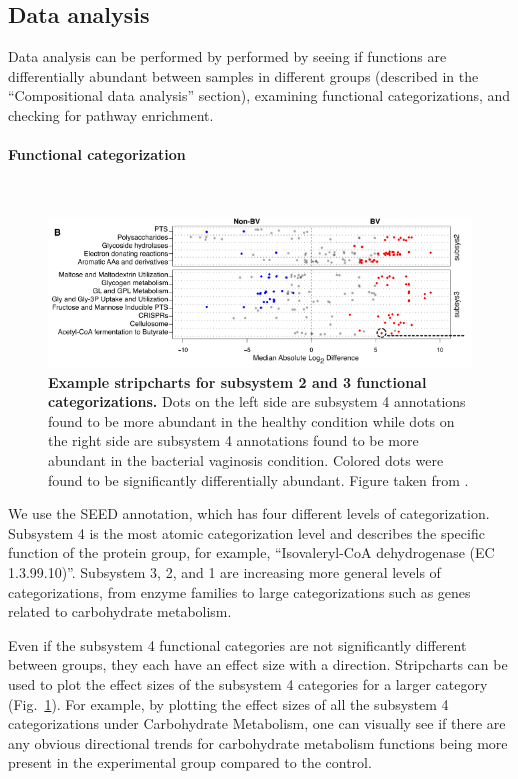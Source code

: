 \subsection{Data analysis}
Data analysis can be performed by performed by seeing if functions are differentially abundant between samples in different groups (described in the “Compositional data analysis” section), examining functional categorizations, and checking for pathway enrichment.

\paragraph{Functional categorization}\mbox{}\\

\begin{figure}[h]
\begin{center}
\includegraphics[width=\textwidth]{stripchart.png}
\caption[Example stripcharts for subsystem 2 and 3 functional categorizations.]{\textbf{Example stripcharts for subsystem 2 and 3 functional categorizations.} Dots on the left side are subsystem 4 annotations found to be more abundant in the healthy condition while dots on the right side are subsystem 4 annotations found to be more abundant in the bacterial vaginosis condition. Colored dots were found to be significantly differentially abundant. Figure taken from \cite{macklaim2013comparative}.}
\end{center}
\label{stripchart_example}
\end{figure}

We use the SEED annotation, which has four different levels of categorization. Subsystem 4 is the most atomic categorization level and describes the specific function of the protein group, for example, “Isovaleryl-CoA dehydrogenase (EC 1.3.99.10)”. Subsystem 3, 2, and 1 are increasing more general levels of categorizations, from enzyme families to large categorizations such as genes related to carbohydrate metabolism.

Even if the subsystem 4 functional categories are not significantly different between groups, they each have an effect size with a direction. Stripcharts can be used to plot the effect sizes of the subsystem 4 categories for a larger category (Fig.~\ref{stripchart_example}). For example, by plotting the effect sizes of all the subsystem 4 categorizations under Carbohydrate Metabolism, one can visually see if there are any obvious directional trends for carbohydrate metabolism functions being more present in the experimental group compared to the control.


